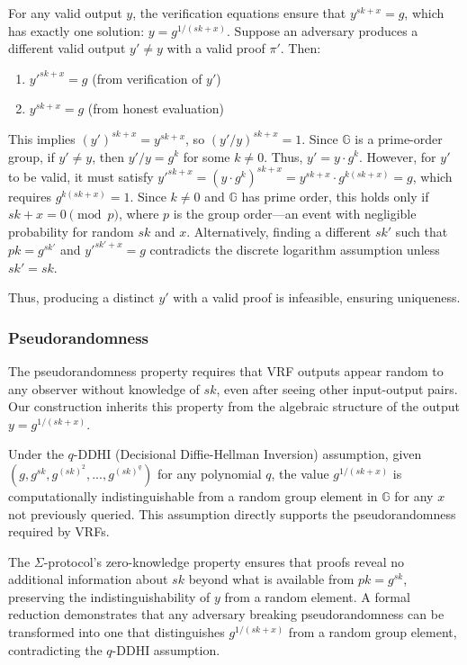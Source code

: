 For any valid output $y$, the verification equations ensure that $y^{sk+x} = g$, which has exactly one solution: $y = g^{1/(sk+x)}$. Suppose an adversary produces a different valid output $y' \neq y$ with a valid proof $\pi'$. Then:

\begin{enumerate}
    \item $y'^{sk+x} = g$ (from verification of $y'$)
    \item $y^{sk+x} = g$ (from honest evaluation)
\end{enumerate}

This implies $(y')^{sk+x} = y^{sk+x}$, so $(y'/y)^{sk+x} = 1$. Since $\mathbb{G}$ is a prime-order group, if $y' \neq y$, then $y'/y = g^k$ for some $k \neq 0$. Thus, $y' = y \cdot g^k$. However, for $y'$ to be valid, it must satisfy $y'^{sk+x} = (y \cdot g^k)^{sk+x} = y^{sk+x} \cdot g^{k(sk+x)} = g$, which requires $g^{k(sk+x)} = 1$. Since $k \neq 0$ and $\mathbb{G}$ has prime order, this holds only if $sk + x = 0 \pmod{p}$, where $p$ is the group order—an event with negligible probability for random $sk$ and $x$. Alternatively, finding a different $sk'$ such that $pk = g^{sk'}$ and $y'^{sk'+x} = g$ contradicts the discrete logarithm assumption unless $sk' = sk$.

Thus, producing a distinct $y'$ with a valid proof is infeasible, ensuring uniqueness.

\subsubsection{Pseudorandomness}
The pseudorandomness property requires that VRF outputs appear random to any observer without knowledge of $sk$, even after seeing other input-output pairs. Our construction inherits this property from the algebraic structure of the output $y = g^{1/(sk+x)}$.

Under the $q$-DDHI (Decisional Diffie-Hellman Inversion) assumption, given $(g, g^{sk}, g^{(sk)^2}, ..., g^{(sk)^q})$ for any polynomial $q$, the value $g^{1/(sk+x)}$ is computationally indistinguishable from a random group element in $\mathbb{G}$ for any $x$ not previously queried. This assumption directly supports the pseudorandomness required by VRFs.

The $\Sigma$-protocol's zero-knowledge property ensures that proofs reveal no additional information about $sk$ beyond what is available from $pk = g^{sk}$, preserving the indistinguishability of $y$ from a random element. A formal reduction demonstrates that any adversary breaking pseudorandomness can be transformed into one that distinguishes $g^{1/(sk+x)}$ from a random group element, contradicting the $q$-DDHI assumption.

